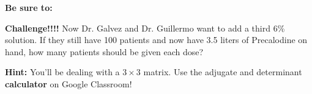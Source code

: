 \documentclass{exam}
\begin{document}
\begin{questions}
\textbf{Be sure to:}

\question \textbf{Challenge!!!!} Now Dr. Galvez and Dr. Guillermo want to add a third 6\% solution.  If they still have 100 patients and now have 3.5 liters of Precalodine on hand, how many patients should be given each dose?

  \textbf{Hint: }  You'll be dealing with a $3\times 3$ matrix. Use the adjugate and determinant \textbf{calculator} on Google Classroom!

\end{questions}
\end{document}
